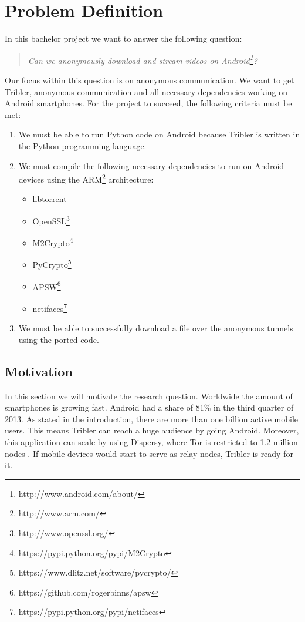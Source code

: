 \chapter{Problem Definition}
\label{cpt:problemdefinition}

In this bachelor project we want to answer the following question:

\begin{quote}
\emph{Can we anonymously download and stream videos on Android\footnote{http://www.android.com/about/}?}
\end{quote}

Our focus within this question is on anonymous communication. We want to get Tribler, anonymous communication and all necessary dependencies working on Android smartphones. For the project to succeed, the following criteria must be met:
\begin{enumerate}
\item We must be able to run Python code on Android because Tribler is written in the Python programming language.
\item We must compile the following necessary dependencies to run on Android devices using the ARM\footnote{http://www.arm.com/} architecture:
\begin{itemize}
\item libtorrent
\item OpenSSL\footnote{http://www.openssl.org/}
\item M2Crypto\footnote{https://pypi.python.org/pypi/M2Crypto}
\item PyCrypto\footnote{https://www.dlitz.net/software/pycrypto/}
\item APSW\footnote{https://github.com/rogerbinns/apsw}
\item netifaces\footnote{https://pypi.python.org/pypi/netifaces}
\end{itemize}
\item We must be able to successfully download a file over the anonymous tunnels using the ported code.
\end{enumerate}

	\section{Motivation}
	\label{sec:motivation}
		In this section we will motivate the research question. Worldwide the amount of smartphones is growing fast. Android had a share of 81\% in the third quarter of 2013\cite{forbesandroidmarket}. As stated in the introduction, there are more than one billion active mobile users. This means Tribler can reach a huge audience by going Android. Moreover, this application can scale by using Dispersy, where Tor is restricted to 1.2 million nodes \cite{mclachlan2009scalable}. If mobile devices would start to serve as relay nodes, Tribler is ready for it.
		
